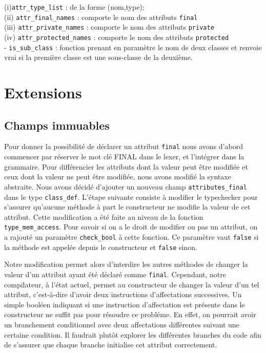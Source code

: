 \documentclass{article}
\begin{document}
(i)\hspace{0.5cm}\texttt{attr\_type\_list} : de la forme (nom,type);\\
(ii)\hspace{0.3cm} \texttt{attr\_final\_names} : comporte le nom des attributs \texttt{final}\\
(iii)\hspace{0.2cm} \texttt{attr\_private\_names} : comporte le nom des attributs \texttt{private}\\
(iv)\hspace{0.2cm} \texttt{attr\_protected\_names} : comporte le nom des attributs \texttt{protected}
\medskip\\
- \texttt{is\_sub\_class} : fonction prenant en paramètre le nom de deux classes et renvoie vrai si la première classe est une sous-classe de la deuxième.
\section{Extensions}
\subsection{Champs immuables}
Pour donner la possibilité de déclarer un attribut \texttt{final} 
nous avons d'abord commencer par réserver le mot clé FINAL dans le lexer, et l'intégrer dans la grammaire.
Pour différencier les attributs dont la valeur peut être modifiée
et ceux dont la valeur ne peut être modifiée, nous avons modifié la syntaxe abstraite. 
Nous avons décidé d'ajouter un nouveau champ \texttt{attributes\_final} 
dans le type \texttt{class\_def}. L'étape suivante consiste à modifier le typechecker pour 
s'assurer qu'aucune méthode à part le constructeur ne modifie la valeur de cet attribut.
Cette modification a été faite au niveau de la fonction \texttt{type\_mem\_access}. Pour 
savoir si on a le droit de modifier ou pas un attribut, on a rajouté un paramètre \texttt{check\_bool}
à cette fonction. Ce paramètre vaut \texttt{false} si la méthode est appelée depuis le constructeur
et \texttt{false} sinon.

Notre modification permet alors d'interdire les autres méthodes de changer la valeur d'un attribut ayant été déclaré comme \texttt{final}.
Cependant, notre compilateur, à l'état actuel, permet au constructeur de changer la valeur d'un tel attribut, c'est-à-dire d'avoir 
deux instructions d'affectations successives. Un simple booléen indiquant si une instruction 
d'affectation est présente dans le constructeur ne suffit pas pour résoudre ce probléme.
En effet, on pourrait avoir un branchement conditionnel avec deux affectations différentes suivant 
une certaine condition. Il faudrait plutôt explorer les différentes branches du code afin 
de s'assurer que chaque branche initialise cet attribut correctement.
\end{document}
